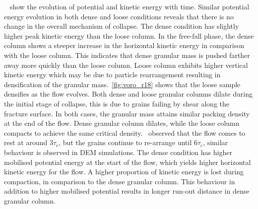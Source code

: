 ~ show the evolution of potential and kinetic 
energy with time. Similar potential energy evolution in both dense and loose 
conditions reveals that there is no change in the overall mechanism of 
collapse. The dense condition has slightly higher peak kinetic energy than the 
loose column. In the free-fall phase, the dense column shows a steeper increase 
in the horizontal kinetic energy in comparison with the loose column. This 
indicates that dense granular mass is pushed farther away more quickly than the 
loose column. Loose column exhibits higher vertical kinetic energy which may be 
due to particle rearrangement resulting in densification of the granular 
mass.~\cref{fig:voro_r18} shows that the loose sample densifies as the flow 
evolves. Both dense and loose granular columns dilate during the initial stage 
of collapse, this is due to grains failing by shear along the fracture surface. 
In both cases, the granular mass attains similar packing density at the end of 
the flow. Dense granular column dilates, while the loose column compacts to 
achieve the same critical density.~\citet{Lajeunesse2004} observed that the 
flow comes to rest at around $3\tau_c$, but the grains continue to re-arrange 
until $6\tau_c$, similar behaviour is observed in DEM simulations. The dense 
condition has higher mobilised potential energy at the start of the flow, which 
yields higher horizontal kinetic energy for the flow. A higher proportion of 
kinetic energy is lost during compaction, in comparison to the dense granular 
column. This behaviour in addition to higher mobilised potential results in 
longer run-out distance in dense granular column.  
